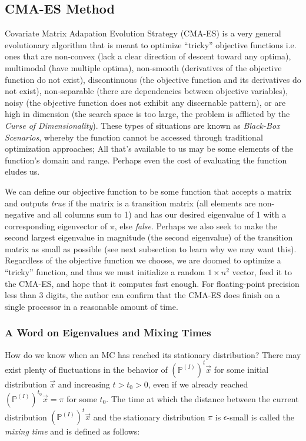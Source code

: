 \documentclass{article}
\begin{document}
\subsection{CMA-ES Method}
Covariate Matrix Adapation Evolution Strategy (CMA-ES) is a very general evolutionary algorithm that is meant to optimize ``tricky'' objective functions i.e. ones that are non-convex (lack a clear direction of descent toward any optima), multimodal (have multiple optima), non-smooth (derivatives of the objective function do not exist), discontinuous (the objective function and its derivatives do not exist), non-separable (there are dependencies between objective variables), noisy (the objective function does not exhibit any discernable pattern), or are high in dimension (the search space is too large, the problem is afflicted by the \textit{Curse of Dimensionality}). These types of situations are known as \textit{Black-Box Scenarios}, whereby the function cannot be accessed through traditional optimization approaches; All that's available to us may be some elements of the function's domain and range. Perhaps even the cost of evaluating the function eludes us. \cite{cma1} \cite{cma2} \cite{cma3} \cite{cma4}

We can define our objective function to be some function that accepts a matrix and outputs \textit{true} if the matrix is a transition matrix (all elements are non-negative and all columns sum to 1) and has our desired eigenvalue of 1 with a corresponding eigenvector of $\pi$, else \textit{false}. Perhaps we also seek to make the second largest eigenvalue in magnitude (the second eigenvalue) of the transition matrix as small as possible (see next subsection to learn why we may want this). Regardless of the objective function we choose, we are doomed to optimize a ``tricky'' function, and thus we must initialize a random $1 \times n^2$ vector, feed it to the CMA-ES, and hope that it computes fast enough. For floating-point precision less than 3 digits, the author can confirm that the CMA-ES does finish on a single processor in a reasonable amount of time.

\subsubsection{A Word on Eigenvalues and Mixing Times} \label{sssec:eigsAndMixes}
How do we know when an MC has reached its stationary distribution? There may exist plenty of fluctuations in the behavior of $(\mathbb{P}^{(I)})^t\vec{x}$ for some initial distribution $\vec{x}$ and increasing $t>t_0>0$, even if we already reached $(\mathbb{P}^{(I)})^{t_0}\vec{x}=\pi$ for some $t_0$. The time at which the distance between the current distribution $(\mathbb{P}^{(I)})^t\vec{x}$ and the stationary distribution $\pi$ is $\epsilon$-small is called the \textit{mixing time} and is defined as follows:
\end{document}
